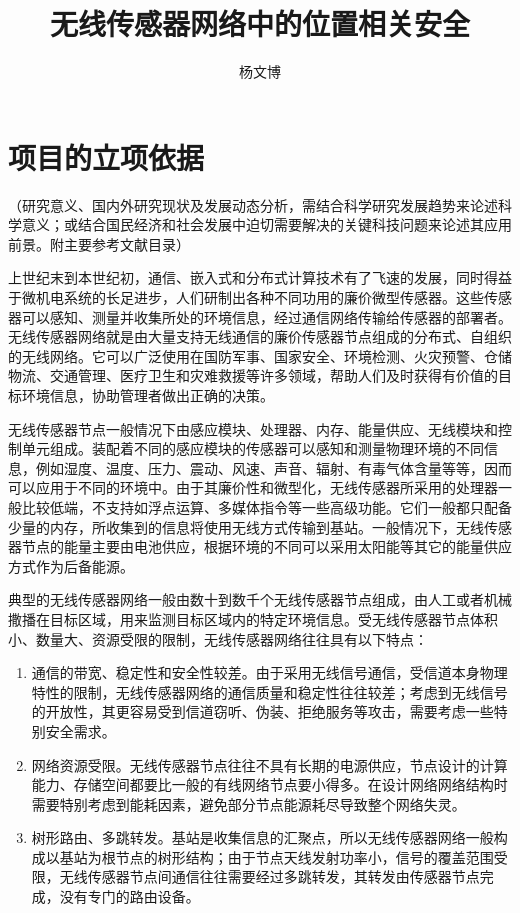 \documentclass[a4paper,10pt]{article}
\title{无线传感器网络中的位置相关安全}
\author{杨文博}
\begin{document}
\maketitle

\section{项目的立项依据} 

（研究意义、国内外研究现状及发展动态分析，需结合科学研究发展趋势来论述科学意义；或结合国民经济和社会发展中迫切需要解决的关键科技问题来论述其应用前景。附主要参考文献目录）

上世纪末到本世纪初，通信、嵌入式和分布式计算技术有了飞速的发展，同时得益于微机电系统的长足进步，人们研制出各种不同功用的廉价微型传感器。这些传感器可以感知、测量并收集所处的环境信息，经过通信网络传输给传感器的部署者。无线传感器网络就是由大量支持无线通信的廉价传感器节点组成的分布式、自组织的无线网络。它可以广泛使用在国防军事、国家安全、环境检测、火灾预警、仓储物流、交通管理、医疗卫生和灾难救援等许多领域，帮助人们及时获得有价值的目标环境信息，协助管理者做出正确的决策。

无线传感器节点一般情况下由感应模块、处理器、内存、能量供应、无线模块和控制单元组成。装配着不同的感应模块的传感器可以感知和测量物理环境的不同信息，例如湿度、温度、压力、震动、风速、声音、辐射、有毒气体含量等等，因而可以应用于不同的环境中。由于其廉价性和微型化，无线传感器所采用的处理器一般比较低端，不支持如浮点运算、多媒体指令等一些高级功能。它们一般都只配备少量的内存，所收集到的信息将使用无线方式传输到基站。一般情况下，无线传感器节点的能量主要由电池供应，根据环境的不同可以采用太阳能等其它的能量供应方式作为后备能源。

典型的无线传感器网络一般由数十到数千个无线传感器节点组成，由人工或者机械撒播在目标区域，用来监测目标区域内的特定环境信息。受无线传感器节点体积小、数量大、资源受限的限制，无线传感器网络往往具有以下特点：

\begin{enumerate}

\item 通信的带宽、稳定性和安全性较差。由于采用无线信号通信，受信道本身物理特性的限制，无线传感器网络的通信质量和稳定性往往较差；考虑到无线信号的开放性，其更容易受到信道窃听、伪装、拒绝服务等攻击，需要考虑一些特别安全需求。

\item 网络资源受限。无线传感器节点往往不具有长期的电源供应，节点设计的计算能力、存储空间都要比一般的有线网络节点要小得多。在设计网络网络结构时需要特别考虑到能耗因素，避免部分节点能源耗尽导致整个网络失灵。

\item 树形路由、多跳转发。基站是收集信息的汇聚点，所以无线传感器网络一般构成以基站为根节点的树形结构；由于节点天线发射功率小，信号的覆盖范围受限，无线传感器节点间通信往往需要经过多跳转发，其转发由传感器节点完成，没有专门的路由设备。

\end{enumerate}
\end{document}
